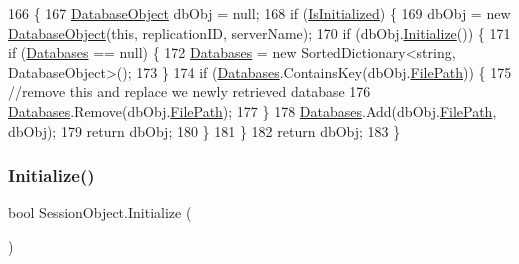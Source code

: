 \begin{DoxyCode}
166                                                                                    \{
167         \mbox{\hyperlink{class_database_object}{DatabaseObject}} dbObj = null;
168         \textcolor{keywordflow}{if} (\mbox{\hyperlink{class_session_object_ae0885b9054fc3ce287307ac16ff69990}{IsInitialized}}) \{
169             dbObj = \textcolor{keyword}{new} \mbox{\hyperlink{class_database_object}{DatabaseObject}}(\textcolor{keyword}{this}, replicationID, serverName);
170             \textcolor{keywordflow}{if} (dbObj.\mbox{\hyperlink{class_database_object_a7de43a21bd287deec537cffec343f41d}{Initialize}}()) \{
171                 \textcolor{keywordflow}{if} (\mbox{\hyperlink{class_session_object_aa0b75f5b9d0a6325f436e08db27204a2}{Databases}} == null) \{
172                     \mbox{\hyperlink{class_session_object_aa0b75f5b9d0a6325f436e08db27204a2}{Databases}} = \textcolor{keyword}{new} SortedDictionary<string, DatabaseObject>();
173                 \}
174                 \textcolor{keywordflow}{if} (\mbox{\hyperlink{class_session_object_aa0b75f5b9d0a6325f436e08db27204a2}{Databases}}.ContainsKey(dbObj.\mbox{\hyperlink{class_database_object_a38a1a78430c6cd1fc4eef054e39145ce}{FilePath}})) \{
175                     \textcolor{comment}{//remove this and replace we newly retrieved database}
176                     \mbox{\hyperlink{class_session_object_aa0b75f5b9d0a6325f436e08db27204a2}{Databases}}.Remove(dbObj.\mbox{\hyperlink{class_database_object_a38a1a78430c6cd1fc4eef054e39145ce}{FilePath}});
177                 \}
178                 \mbox{\hyperlink{class_session_object_aa0b75f5b9d0a6325f436e08db27204a2}{Databases}}.Add(dbObj.\mbox{\hyperlink{class_database_object_a38a1a78430c6cd1fc4eef054e39145ce}{FilePath}}, dbObj);
179                 \textcolor{keywordflow}{return} dbObj;
180             \}
181         \}
182         \textcolor{keywordflow}{return} dbObj;
183     \}
\end{DoxyCode}
\mbox{\label{class_session_object_af3b9c9d56d98c848061952ed935f815b}} 
\subsubsection{\texorpdfstring{Initialize()}{Initialize()}}
{\footnotesize\ttfamily bool Session\+Object.\+Initialize (\begin{DoxyParamCaption}{ }\end{DoxyParamCaption})}



